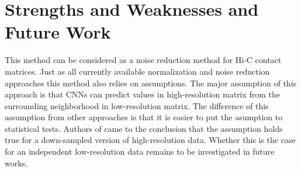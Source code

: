 \documentclass{article}
\begin{document}
\section{Strengths and Weaknesses and Future Work}
This method can be considered as a noise reduction method
for Hi-C contact matrices. Just as all currently available
normalization and noise reduction approaches this method
also relies on assumptions. The major assumption of this
approach is that CNNs can predict values in high-resolution
matrix from the surrounding neighborhood in low-resolution
matrix. The difference of this assumption from other 
approaches is that it is easier to put the asumption to
statistical tests. Authors of \cite{zhang2018enhancing}
came to the conclusion that the assumption holds true for
a down-sampled version of high-resolution data. Whether
this is the case for an independent low-resolution data
remains to be investigated in future works.





\begin{acronym}
\end{acronym}
\end{document}
